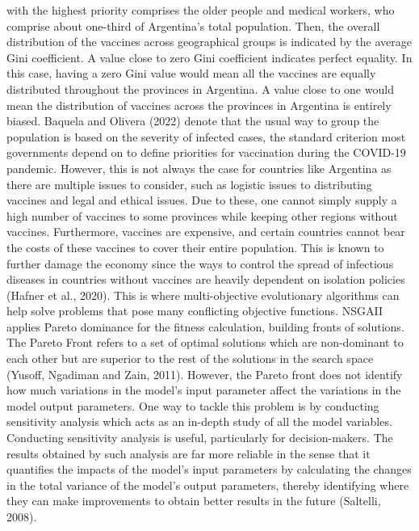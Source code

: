 \documentclass[smallextended]{svjour3}       %
\begin{document}
with the highest priority comprises the older people and medical workers, who comprise about
one-third of Argentina’s total population. Then, the overall distribution of the vaccines across
geographical groups is indicated by the average Gini coefficient. A value close to zero Gini
coefficient indicates perfect equality. In this case, having a zero Gini value would mean all the
vaccines are equally distributed throughout the provinces in Argentina. A value close to one
would mean the distribution of vaccines across the provinces in Argentina is entirely biased.
Baquela and Olivera (2022) denote that the usual way to group the population is based on the
severity of infected cases, the standard criterion most governments depend on to define
priorities for vaccination during the COVID-19 pandemic. However, this is not always the case
for countries like Argentina as there are multiple issues to consider, such as logistic issues to
distributing vaccines and legal and ethical issues. Due to these, one cannot simply supply a high
number of vaccines to some provinces while keeping other regions without vaccines.
Furthermore, vaccines are expensive, and certain countries cannot bear the costs of these
vaccines to cover their entire population. This is known to further damage the economy since
the ways to control the spread of infectious diseases in countries without vaccines are heavily dependent on isolation policies (Hafner et al., 2020). This is where multi-objective evolutionary
algorithms can help solve problems that pose many conflicting objective functions. NSGAII
applies Pareto dominance for the fitness calculation, building fronts of solutions. The Pareto
Front refers to a set of optimal solutions which are non-dominant to each other but are
superior to the rest of the solutions in the search space (Yusoff, Ngadiman and Zain, 2011).
However, the Pareto front does not identify how much variations in the model’s input
parameter affect the variations in the model output parameters. One way to tackle this
problem is by conducting sensitivity analysis which acts as an in-depth study of all the model
variables. Conducting sensitivity analysis is useful, particularly for decision-makers. The results
obtained by such analysis are far more reliable in the sense that it quantifies the impacts of the
model’s input parameters by calculating the changes in the total variance of the model’s output
parameters, thereby identifying where they can make improvements to obtain better results in
the future (Saltelli, 2008).
\end{document}
